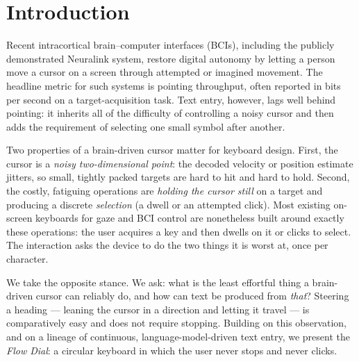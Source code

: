 \documentclass[manuscript,review,anonymous]{acmart}
\begin{document}


\maketitle

\section{Introduction}
Recent intracortical brain--computer interfaces (BCIs), including the publicly
demonstrated Neuralink system, restore digital autonomy by letting a person move
a cursor on a screen through attempted or imagined movement. The headline metric
for such systems is pointing throughput, often reported in bits per second on a
target-acquisition task. Text entry, however, lags well behind pointing: it
inherits all of the difficulty of controlling a noisy cursor and then adds the
requirement of selecting one small symbol after another.

Two properties of a brain-driven cursor matter for keyboard design. First, the
cursor is a \emph{noisy two-dimensional point}: the decoded velocity or position
estimate jitters, so small, tightly packed targets are hard to hit and hard to
hold. Second, the costly, fatiguing operations are \emph{holding the cursor
still} on a target and producing a discrete \emph{selection} (a dwell or an
attempted click). Most existing on-screen keyboards for gaze and BCI control are
nonetheless built around exactly these operations: the user acquires a key and
then dwells on it or clicks to select. The interaction asks the device to do the
two things it is worst at, once per character.

We take the opposite stance. We ask: what is the least effortful thing a
brain-driven cursor can reliably do, and how can text be produced from
\emph{that}? Steering a heading --- leaning the cursor in a direction and letting
it travel --- is comparatively easy and does not require stopping. Building on
this observation, and on a lineage of continuous, language-model-driven text
entry, we present the \emph{Flow Dial}: a circular keyboard in which the user
never stops and never clicks.
\end{document}
